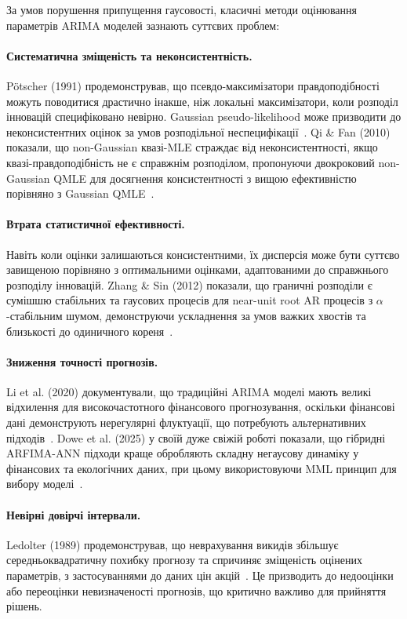\documentclass[12pt,a4paper]{article}
\begin{document}
За умов порушення припущення гаусовості, класичні методи оцінювання параметрів ARIMA моделей зазнають суттєвих проблем:

\paragraph{Систематична зміщеність та неконсистентність.} Pötscher (1991) продемонстрував, що псевдо-максимізатори правдоподібності можуть поводитися драстично інакше, ніж локальні максимізатори, коли розподіл інновацій специфіковано невірно. Gaussian pseudo-likelihood може призводити до неконсистентних оцінок за умов розподільної неспецифікації~\cite{potscher1991noninvertibility}. Qi \& Fan (2010) показали, що non-Gaussian квазі-MLE страждає від неконсистентності, якщо квазі-правдоподібність не є справжнім розподілом, пропонуючи двокроковий non-Gaussian QMLE для досягнення консистентності з вищою ефективністю порівняно з Gaussian QMLE~\cite{qi2010non}.

\paragraph{Втрата статистичної ефективності.} Навіть коли оцінки залишаються консистентними, їх дисперсія може бути суттєво завищеною порівняно з оптимальними оцінками, адаптованими до справжнього розподілу інновацій. Zhang \& Sin (2012) показали, що граничні розподіли є сумішшю стабільних та гаусових процесів для near-unit root AR процесів з $\alpha$-стабільним шумом, демонструючи ускладнення за умов важких хвостів та близькості до одиничного кореня~\cite{zhang2012maximum}.

\paragraph{Зниження точності прогнозів.} Li et al. (2020) документували, що традиційні ARIMA моделі мають великі відхилення для високочастотного фінансового прогнозування, оскільки фінансові дані демонструють нерегулярні флуктуації, що потребують альтернативних підходів~\cite{li2020forecasting}. Dowe et al. (2025) у своїй дуже свіжій роботі показали, що гібридні ARFIMA-ANN підходи краще обробляють складну негаусову динаміку у фінансових та екологічних даних, при цьому використовуючи MML принцип для вибору моделі~\cite{dowe2025novel}.

\paragraph{Невірні довірчі інтервали.} Ledolter (1989) продемонстрував, що неврахування викидів збільшує середньоквадратичну похибку прогнозу та спричиняє зміщеність оцінених параметрів, з застосуваннями до даних цін акцій~\cite{ledolter1989inference}. Це призводить до недооцінки або переоцінки невизначеності прогнозів, що критично важливо для прийняття рішень.
\end{document}
